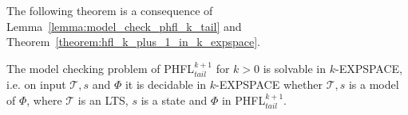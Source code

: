 The following theorem is a consequence of Lemma~\ref{lemma:model_check_phfl_k_tail} and
Theorem~\ref{theorem:hfl_k_plus_1_in_k_expspace}.

\begin{theorem}
    \label{theorem:phfl_k_plus_1_tail_in_k_expspace}
The model checking problem of PHFL$^{k + 1}_{tail}$ for $k > 0$ is solvable in $k$-EXPSPACE, i.e. on input $\mathcal{T}, s$ and $\Phi$ it is decidable in $k$-EXPSPACE whether $\mathcal{T}, s$ is a model of $\Phi$, where $\mathcal{T}$ is an LTS, $s$ is a state and $\Phi$ in PHFL$^{k + 1}_{tail}$.        
\end{theorem}